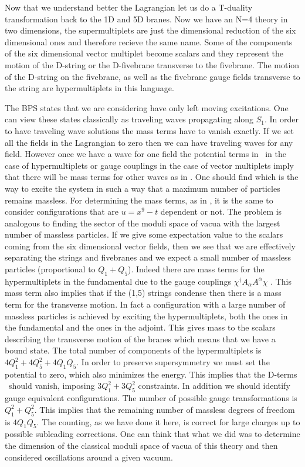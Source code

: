 Now that we understand better the Lagrangian let us do 
a T-duality transformation 
back to the 1D and 5D branes. Now we have an N=4 theory
in two dimensions, the supermultiplets are just the 
dimensional reduction of the six dimensional ones and
therefore
recieve the same name.
Some of the components of the six dimensional vector
multiplet become scalars and they represent the motion 
of the D-string or the D-fivebrane transverse to the
fivebrane. The motion of the D-string on the fivebrane, 
as well as the fivebrane gauge fields transverse to the string
are hypermultiplets in this language. 

The BPS states that we are considering have only left moving
excitations. One can view these states classically as traveling
waves 
propagating along $S_1$. In order to have traveling wave solutions
the mass terms have to vanish exactly. 
If we set all the fields in the Lagrangian  to zero then 
we can have traveling waves for any field. However once we
have a wave for one field the potential terms in \fullac\
in the case of hypermultiplets or gauge couplings 
in the case of vector multiplets imply that there will
be mass terms for other waves as in \offdia . 
One should find which is the way to excite the system 
in such a way that a maximum number of particles remains 
massless. 
For determining the mass terms, as in \offdia , it is the same
to consider configurations that are $u=x^9 -t$ dependent or
not. The problem is analogous to finding the  sector of the
moduli space of vacua with the largest number of massless 
particles. 
If we give some expectation value to the scalars coming
from the six dimensional vector fields, then we see that
we are effectively   separating the strings and fivebranes
and we expect a small number of massless particles (proportional
to $Q_1 + Q_5$). Indeed there are mass terms for the
hypermultiplets in the fundamental due to the gauge 
couplings $ \chi^\dagger A_\alpha A^\alpha \chi $ \fullac . 
This mass term also implies that if the (1,5) strings condense
then there is a mass term for the transverse motion. 
In fact a configuration with a large number of massless 
particles is achieved by exciting the hypermultiplets, 
both the ones in the fundamental and the ones in the 
adjoint. This gives mass to the scalars describing the
transverse motion of the branes which means that
we have a bound state.
The total number of components of the hypermultiplets is
$4 Q_1^2 + 4 Q_5^2  + 4 Q_1 Q_5 $. In order to preserve supersymmetry
we must set the potential to zero, which  also minimizes the energy.
This implies that the D-terms \dfull\ should vanish, 
imposing $ 3 Q_1^2 + 3Q_5^2 $ constraints. In addition we should
identify  gauge equivalent configurations. The number
of possible gauge transformations is $Q_1^2 + Q_5^2 $. This 
implies that the remaining  number of  massless
degrees of freedom is $ 4 Q_1 Q_5 $. 
The counting, as we have done it here, is correct for large 
charges up to possible subleading corrections. 
One can think that what we did was to determine the dimension
of the classical moduli space of vacua of this theory and then
considered oscillations around a given vacuum. 

